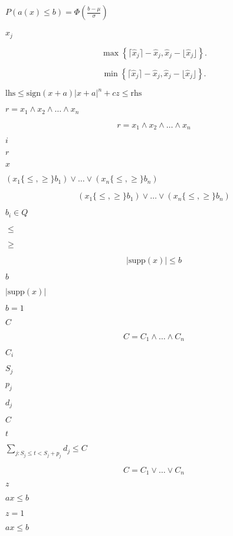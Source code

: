 \documentclass{article}
\begin{document}
$ P(a(x) \leq b) = \Phi(\frac{b - \mu}{\sigma})$
\pagebreak

$ \hat{x}_j$
\pagebreak

\[
     \max \left\{ \lceil \hat{x}_j \rceil - \hat{x}_j, \hat{x}_j - \lfloor \hat{x}_j \rfloor  \right\}.
\]
\pagebreak

\[
     \min \left\{ \lceil \hat{x}_j \rceil - \hat{x}_j, \hat{x}_j - \lfloor \hat{x}_j \rfloor  \right\}.
\]
\pagebreak

$\textrm{lhs} \leq \textrm{sign}(x+a) |x+a|^n + c z \leq \textrm{rhs}$
\pagebreak

$r = x_1 \wedge x_2 \wedge \dots  \wedge x_n$
\pagebreak

\[
   r = x_1 \wedge x_2 \wedge \dots  \wedge x_n
\]
\pagebreak

$i$
\pagebreak

$r$
\pagebreak

$x$
\pagebreak

$(x_1 \{\leq,\geq\} b_1) \vee \ldots \vee (x_n \{\leq,\geq\} b_n)$
\pagebreak

\[
  (x_1 \{\leq,\geq\} b_1) \vee \ldots \vee (x_n \{\leq,\geq\} b_n)
\]
\pagebreak

$b_i \in Q$
\pagebreak

$\leq$
\pagebreak

$\geq$
\pagebreak

\[
  |\mbox{supp}(x)| \leq b
\]
\pagebreak

$b$
\pagebreak

$|\mbox{supp}(x)|$
\pagebreak

$b = 1$
\pagebreak

$ C $
\pagebreak

\[
  C = C_1 \wedge \dots \wedge C_n
\]
\pagebreak

$ C_i $
\pagebreak

$S_j$
\pagebreak

$p_j$
\pagebreak

$d_j$
\pagebreak

$C$
\pagebreak

$t$
\pagebreak

$\sum_{j: S_j \leq t < S_j + p_j} d_j \leq C$
\pagebreak

\[
  C = C_1 \vee \dots \vee C_n
\]
\pagebreak

$z$
\pagebreak

$ax \leq
b$
\pagebreak

$z = 1$
\pagebreak

$ax \leq b$
\pagebreak
\end{document}
